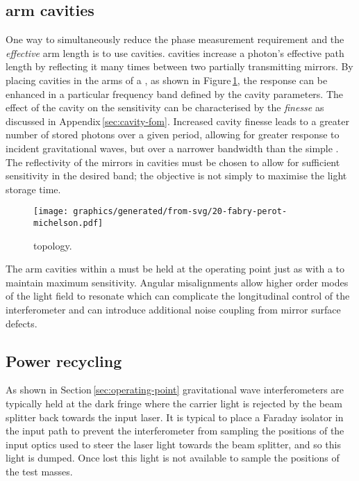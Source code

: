 \subsection{\label{sec:fabry-perot-cavities}\FP{} arm cavities}
One way to simultaneously reduce the phase measurement requirement and the \emph{effective} arm length is to use \FP{} cavities. \FP{} cavities increase a photon's effective path length by reflecting it many times between two partially transmitting mirrors. By placing \FP{} cavities in the arms of a \MI{}, as shown in Figure\,\ref{fig:fpmi}, the response can be enhanced in a particular frequency band defined by the cavity parameters. The effect of the cavity on the sensitivity can be characterised by the \emph{finesse} as discussed in Appendix\,\ref{sec:cavity-fom}. Increased cavity finesse leads to a greater number of stored photons over a given period, allowing for greater response to incident gravitational waves, but over a narrower bandwidth than the simple \MI{}. The reflectivity of the mirrors in \FP{} cavities must be chosen to allow for sufficient sensitivity in the desired band; the objective is not simply to maximise the light storage time.

\begin{figure}
  \centering
  \texttt{[image: graphics/generated/from-svg/20-fabry-perot-michelson.pdf]}
  \caption[\FPMI{}]{\label{fig:fpmi}\FPMI{} topology.}
\end{figure}

The arm cavities within a \FPMI{} must be held at the operating point just as with a \MI{} to maintain maximum sensitivity. Angular misalignments allow higher order modes of the light field to resonate which can complicate the longitudinal control of the interferometer and can introduce additional noise coupling from mirror surface defects.

\subsection{\label{sec:power-recycling}Power recycling}
As shown in Section\,\ref{sec:operating-point} gravitational wave interferometers are typically held at the dark fringe where the carrier light is rejected by the beam splitter back towards the input laser. It is typical to place a Faraday isolator in the input path to prevent the interferometer from sampling the positions of the input optics used to steer the laser light towards the beam splitter, and so this light is dumped. Once lost this light is not available to sample the positions of the test masses.

